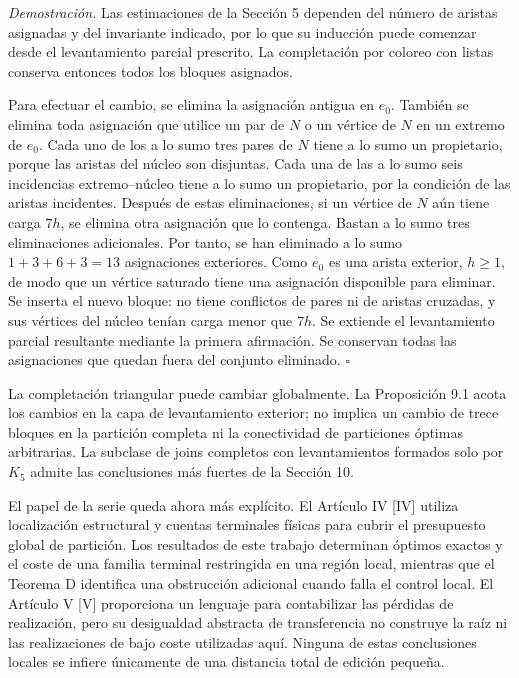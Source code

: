 \documentclass[spanish,11pt,a4paper]{article}
\begin{document}
\emph{Demostración.} Las estimaciones de la Sección 5 dependen del
número de aristas asignadas y del invariante indicado, por lo que su
inducción puede comenzar desde el levantamiento parcial prescrito. La
completación por coloreo con listas conserva entonces todos los bloques
asignados.

Para efectuar el cambio, se elimina la asignación antigua en \(e_0\).
También se elimina toda asignación que utilice un par de \(N\) o un
vértice de \(N\) en un extremo de \(e_0\). Cada uno de los a lo sumo
tres pares de \(N\) tiene a lo sumo un propietario, porque las aristas
del núcleo son disjuntas. Cada una de las a lo sumo seis incidencias
extremo--núcleo tiene a lo sumo un propietario, por la condición de las
aristas incidentes. Después de estas eliminaciones, si un vértice de
\(N\) aún tiene carga \(7h\), se elimina otra asignación que lo
contenga. Bastan a lo sumo tres eliminaciones adicionales. Por tanto, se
han eliminado a lo sumo \(1+3+6+3=13\) asignaciones exteriores. Como
\(e_0\) es una arista exterior, \(h\ge1\), de modo que un vértice
saturado tiene una asignación disponible para eliminar. Se inserta el
nuevo bloque: no tiene conflictos de pares ni de aristas cruzadas, y sus
vértices del núcleo tenían carga menor que \(7h\). Se extiende el
levantamiento parcial resultante mediante la primera afirmación. Se
conservan todas las asignaciones que quedan fuera del conjunto
eliminado. \(\square\)

La completación triangular puede cambiar globalmente. La Proposición 9.1
acota los cambios en la capa de levantamiento exterior; no implica un
cambio de trece bloques en la partición completa ni la conectividad de
particiones óptimas arbitrarias. La subclase de joins completos con
levantamientos formados solo por \(K_5\) admite las conclusiones más
fuertes de la Sección 10.

El papel de la serie queda ahora más explícito. El Artículo IV {[}IV{]}
utiliza localización estructural y cuentas terminales físicas para
cubrir el presupuesto global de partición. Los resultados de este
trabajo determinan óptimos exactos y el coste de una familia terminal
restringida en una región local, mientras que el Teorema D identifica
una obstrucción adicional cuando falla el control local. El Artículo V
{[}V{]} proporciona un lenguaje para contabilizar las pérdidas de
realización, pero su desigualdad abstracta de transferencia no construye
la raíz ni las realizaciones de bajo coste utilizadas aquí. Ninguna de
estas conclusiones locales se infiere únicamente de una distancia total
de edición pequeña.
\end{document}
